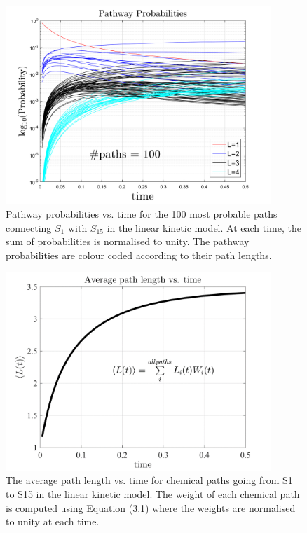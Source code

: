 \begin{figure}[htbp]
	\caption[Pathway probabilities vs. time]{Pathway probabilities vs. time for the 100 most probable paths connecting $S_1$ with $S_{15}$
in the linear kinetic model. At each time, the sum of probabilities is normalised to unity. The
pathway probabilities are colour coded according to their path lengths.}
    \begin{center}
	\includegraphics[width=100mm]{figs/chapter2dot5/fig5.png}
    \end{center}
\label{ch2dot5:fig5}
\end{figure}
\begin{figure}[htbp]
	\caption[The average path length vs. time]{The average path length vs. time for chemical paths going from S1 to S15 in the linear
kinetic model. The weight of each chemical path is computed using Equation (3.1) where the
weights are normalised to unity at each time.}
    \begin{center}
	\includegraphics[width=100mm]{figs/chapter2dot5/fig6.png}
    \end{center}
\label{ch2dot5:fig6}
\end{figure}